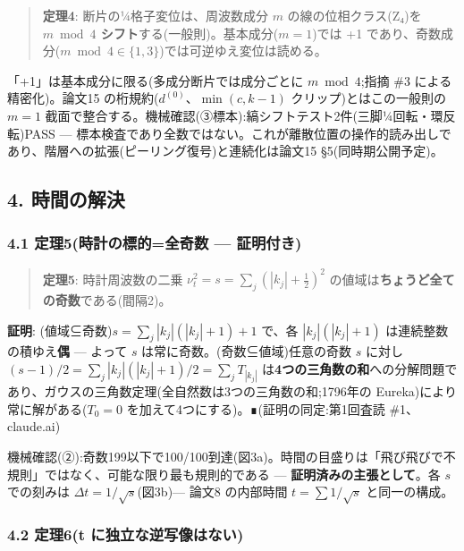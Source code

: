 \documentclass[
]{ltjsarticle}
\begin{document}
\begin{quote}
\textbf{定理4}: 断片の¼格子変位は、周波数成分 \(m\)
の線の位相クラス(Z₄)を \textbf{\(m\bmod 4\)
シフト}する(一般則)。基本成分(\(m=1\))では +1
であり、奇数成分(\(m\bmod4\in\{1,3\}\))では可逆ゆえ変位は読める。
\end{quote}

「+1」は基本成分に限る(多成分断片では成分ごとに \(m\bmod4\);指摘 \#3
による精密化)。論文15 の桁規約(\(d^{(0)}\)、\(\min(c,k{-}1)\)
クリップ)とはこの一般則の \(m=1\)
截面で整合する。機械確認(③標本):縞シフトテスト2件(三脚¼回転・環反転)PASS
---
標本検査であり全数ではない。これが離散位置の操作的読み出しであり、階層への拡張(ピーリング復号)と連続化は論文15
§5(同時期公開予定)。

\subsection{4. 時間の解決}\label{ux6642ux9593ux306eux89e3ux6c7a}

\subsubsection{4.1 定理5(時計の標的=全奇数 ---
証明付き)}\label{ux5b9aux74065ux6642ux8a08ux306eux6a19ux7684ux5168ux5947ux6570-ux8a3cux660eux4ed8ux304d}

\begin{quote}
\textbf{定理5}: 時計周波数の二乗 \(\nu_t^2=s=\sum_j(|k_j|+\tfrac12)^2\)
の値域は\textbf{ちょうど全ての奇数}である(間隔2)。
\end{quote}

\textbf{証明}: (値域⊆奇数)\(s=\sum_j|k_j|(|k_j|+1)+1\) で、各
\(|k_j|(|k_j|+1)\) は連続整数の積ゆえ\textbf{偶} --- よって \(s\)
は常に奇数。(奇数⊆値域)任意の奇数 \(s\) に対し
\((s-1)/2=\sum_j|k_j|(|k_j|+1)/2=\sum_j T_{|k_j|}\)
は\textbf{4つの三角数の和}への分解問題であり、ガウスの三角数定理(全自然数は3つの三角数の和;1796年の
Eureka)により常に解がある(\(T_0=0\)
を加えて4つにする)。∎(証明の同定:第1回査読 \#1、claude.ai)

機械確認(②):奇数199以下で100/100到達(図3a)。時間の目盛りは「飛び飛びで不規則」ではなく、可能な限り最も規則的である
--- \textbf{証明済みの主張として}。各 \(s\) での刻みは
\(\Delta t=1/\sqrt{s}\)(図3b)--- 論文8 の内部時間 \(t=\sum 1/\sqrt{s}\)
と同一の構成。

\subsubsection{4.2 定理6(t
に独立な逆写像はない)}\label{ux5b9aux74066t-ux306bux72ecux7acbux306aux9006ux5199ux50cfux306fux306aux3044}
\end{document}
